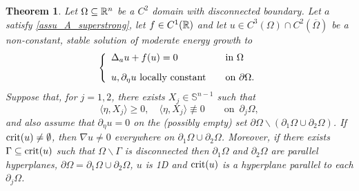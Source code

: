 \documentclass[10 pt,a4paper]{article}
\newtheorem{theorem}[definition]{Theorem}
\theoremstyle{definition}
\begin{document}
\begin{theorem}\label{teo_twopieces}
	Let $\Omega\subseteq\mathbb R^n$ be a $C^2$ domain with disconnected boundary. Let $a$ satisfy \eqref{assu_A_superstrong}, let $f \in C^1(\mathbb R)$ and let $u \in C^3(\Omega) \cap C^2(\overline\Omega)$ be a non-constant, stable solution of moderate energy growth to
	\[
	\left\{
	\begin{array}{l@{\qquad}l}
		\Delta_a u + f(u) = 0 & \text{in } \Omega \\[0.3cm]
		u, \partial_\eta u \text{ locally constant} & \text{on } \partial\Omega.
	\end{array}
	\right.
	\]
	Suppose that, for $j=1,2$, there exists $X_j \in \mathbb{S}^{n-1}$ such that
	\[
	\langle \eta, X_j \rangle \ge 0, \quad \langle \eta,X_j \rangle \not\equiv 0 \qquad \text{on } \, \partial_j \Omega, 
	\]
	and also assume that $\partial_\eta u = 0$ on the (possibly empty) set $\partial\Omega \backslash (\partial_1\Omega \cup \partial_2\Omega)$. If ${\rm crit}(u)\neq\emptyset$, then $\nabla u \neq 0$ everywhere on $\partial_1\Omega \cup \partial_2\Omega$. %
	Moreover, if there exists $\Gamma\subseteq{\rm crit}(u)$ such that $\Omega\backslash\Gamma$ is disconnected then $\partial_1\Omega$ and $\partial_2\Omega$ are parallel hyperplanes, $\partial\Omega = \partial_1\Omega \cup \partial_2\Omega$, $u$ is 1D and ${\rm crit}(u)$ is a hyperplane parallel to each $\partial_j\Omega$.
\end{theorem}
\end{document}
